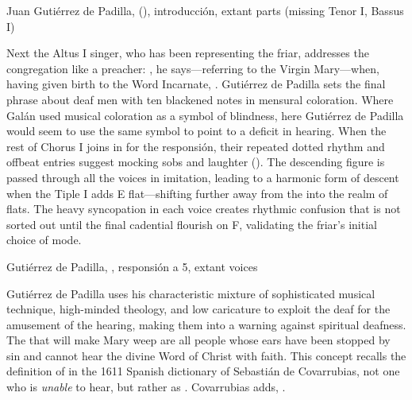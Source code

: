
{Juan Gutiérrez de Padilla, 
(), introducción, extant parts (missing Tenor I, Bassus
I)}

Next the Altus I singer, who has been representing the friar, addresses the
congregation like a preacher: , he says---referring to the Virgin Mary---when, having given birth to the
Word Incarnate, .  
Gutiérrez de Padilla sets the final phrase about deaf men with ten blackened
notes in mensural coloration.
Where Galán used musical coloration as a symbol of blindness, here Gutiérrez de
Padilla would seem to use the same symbol to point to a deficit in hearing.
When the rest of Chorus I joins in for the responsión, their repeated dotted
rhythm and offbeat entries suggest mocking sobs and laughter 
().
The descending figure is passed through all the voices in imitation, leading to
a harmonic form of descent when the Tiple I adds E flat---shifting further away
from the  into the  realm of flats.
The heavy syncopation in each voice creates rhythmic confusion that is not
sorted out until the final cadential flourish on F, validating the friar's
initial choice of mode.

{Gutiérrez de Padilla, , responsión a 5,
extant voices}

Gutiérrez de Padilla uses his characteristic mixture of sophisticated musical
technique, high-minded theology, and low caricature to exploit the deaf for the
amusement of the hearing, making them into a warning against spiritual deafness.
The  that will make Mary weep are all people whose ears have
been stopped by sin and cannot hear the divine Word of Christ with faith.
This concept recalls the definition of  in the 1611 Spanish
dictionary of Sebastián de Covarrubias, not one who is \emph{unable} to hear,
but rather as .
Covarrubias adds, .%
    \Autocite
    [: .] 
    {Covarrubias:Tesoro}

